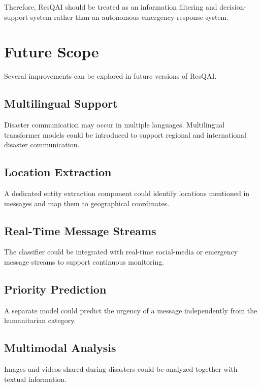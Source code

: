 \documentclass[12pt,a4paper]{article}
\begin{document}
Therefore, ResQAI should be treated as an information filtering and
decision-support system rather than an autonomous emergency-response system.

\section{Future Scope}

Several improvements can be explored in future versions of ResQAI.

\subsection{Multilingual Support}

Disaster communication may occur in multiple languages. Multilingual
transformer models could be introduced to support regional and international
disaster communication.

\subsection{Location Extraction}

A dedicated entity extraction component could identify locations mentioned in
messages and map them to geographical coordinates.

\subsection{Real-Time Message Streams}

The classifier could be integrated with real-time social-media or emergency
message streams to support continuous monitoring.

\subsection{Priority Prediction}

A separate model could predict the urgency of a message independently from
the humanitarian category.

\subsection{Multimodal Analysis}

Images and videos shared during disasters could be analyzed together with
textual information.
\end{document}
